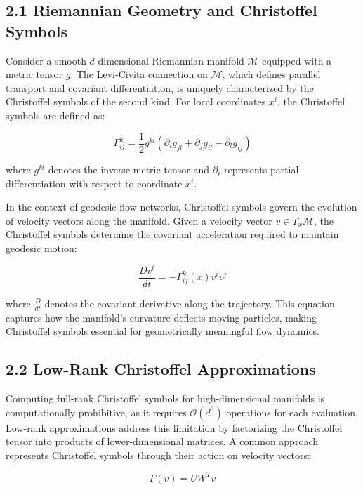 \documentclass[12pt]{article}
\begin{document}
\subsection{2.1 Riemannian Geometry and Christoffel Symbols}

Consider a smooth $d$-dimensional Riemannian manifold $\mathcal{M}$ equipped with a metric tensor $g$. The Levi-Civita connection on $\mathcal{M}$, which defines parallel transport and covariant differentiation, is uniquely characterized by the Christoffel symbols of the second kind. For local coordinates $x^i$, the Christoffel symbols are defined as:

\begin{equation}
\Gamma^k_{ij} = \frac{1}{2} g^{kl} \left( \partial_i g_{jl} + \partial_j g_{il} - \partial_l g_{ij} \right)
\end{equation}

where $g^{kl}$ denotes the inverse metric tensor and $\partial_i$ represents partial differentiation with respect to coordinate $x^i$.

In the context of geodesic flow networks, Christoffel symbols govern the evolution of velocity vectors along the manifold. Given a velocity vector $v \in T_x\mathcal{M}$, the Christoffel symbols determine the covariant acceleration required to maintain geodesic motion:

\begin{equation}
\frac{Dv^t}{dt} = -\Gamma^k_{ij}(x) v^i v^j
\end{equation}

where $\frac{D}{dt}$ denotes the covariant derivative along the trajectory. This equation captures how the manifold's curvature deflects moving particles, making Christoffel symbols essential for geometrically meaningful flow dynamics.

\subsection{2.2 Low-Rank Christoffel Approximations}

Computing full-rank Christoffel symbols for high-dimensional manifolds is computationally prohibitive, as it requires $\mathcal{O}(d^3)$ operations for each evaluation. Low-rank approximations address this limitation by factorizing the Christoffel tensor into products of lower-dimensional matrices. A common approach represents Christoffel symbols through their action on velocity vectors:

\begin{equation}
\Gamma(v) = U W^T v
\end{equation}
\end{document}
